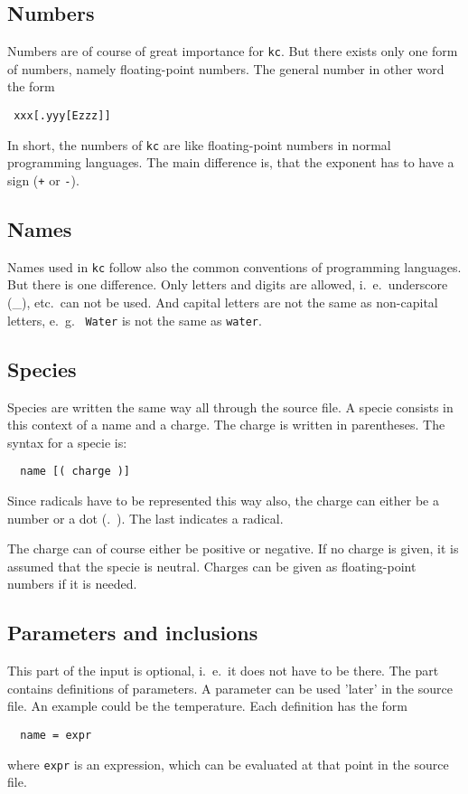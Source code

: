 \subsection{Numbers}
Numbers are of course of great importance for {\tt kc}. But there exists only one
form of numbers, namely floating-point numbers. The general number in other word the form
\begin{verbatim}
 xxx[.yyy[Ezzz]]
\end{verbatim}
In short, the numbers of {\tt kc} are like floating-point numbers in normal programming
languages. The main difference is, that the exponent has to have a sign ({\tt +} or {\tt -}).

\subsection{Names}
Names used in {\tt kc} follow also the common conventions of programming languages. But
there is one difference. Only letters and digits are allowed, i.\ e.\ underscore (\_),
etc.\ can not be used. And capital letters are not the same as non-capital letters, e.~g.~ 
{\tt Water} is not the same as {\tt water}. 

\subsection{Species}
Species are written the same way all through the source file. A specie consists 
in this context of a name and a charge. The charge is written in parentheses. The
syntax for a specie is:
\begin{verbatim}
  name [( charge )]
\end{verbatim}
Since radicals have to be represented this way also, the charge can either
be a number or a dot (.~). The last indicates a radical. 

The charge can of course either be positive or negative. If no charge is
given, it is assumed that the specie is neutral. Charges can be given
as floating-point numbers if it is needed.

\subsection{Parameters and inclusions}
This part of the input is optional, i.~e.~it does not have to be there. 
The part contains definitions of parameters. A parameter can be used 'later' in the
source file. An example could be the temperature. Each definition has the form
\begin{verbatim}
  name = expr
\end{verbatim}
where {\tt expr} is an expression, which can be evaluated at that point in the source
file. 

